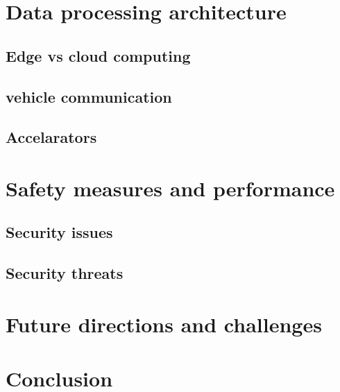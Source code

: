 \documentclass[10pt,oneside,english,a4paper]{article}
\begin{document}
\section{Data processing architecture} \label{architecture}

\subsection{Edge vs cloud computing}

\subsection{vehicle communication}

\subsection{Accelarators}




\section{Safety measures and performance} \label{safety}

\subsection{Security issues}

\subsection{Security threats}


\section{Future directions and challenges} \label{future}




\section{Conclusion} \label{conclusion}





\newpage

\end{document}
